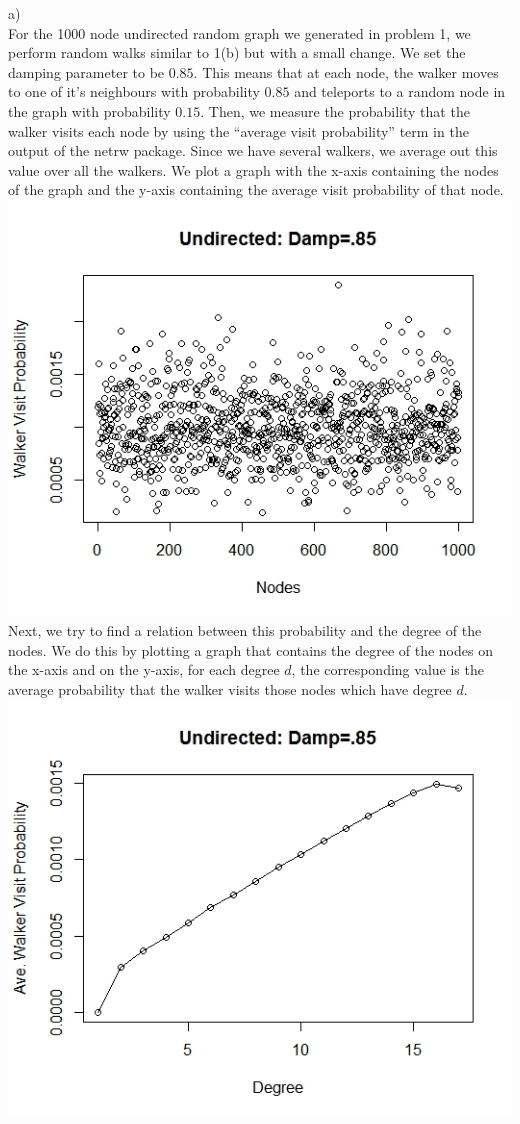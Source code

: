 \documentclass{article}
\begin{document}
a)\\
For the 1000 node undirected random graph we generated in problem 1, we perform random walks similar to 1(b) but 
with a small change. We set the damping parameter to be $0.85$. This means that at each node, the walker
moves to one of it's neighbours with probability $0.85$ and teleports to a random node in the graph
with probability $0.15$. Then, we measure the probability that the walker visits each node by using the ``average visit probability'' term
in the output of the netrw package. Since we have several walkers, we average out this value over all the walkers.
We plot a graph with the x-axis containing the nodes of the graph and the y-axis containing the 
average visit probability of that node.\\
\includegraphics[scale=0.4]{p3f} \\
Next, we try to find a relation between this probability and the degree of the nodes.
We do this by plotting a graph that contains the degree of the nodes on the x-axis and on the y-axis,
for each degree $d$, the corresponding value is the average probability that the walker visits those nodes which
have degree $d$.\\
\includegraphics[scale=0.4]{p3g} \\
\end{document}
